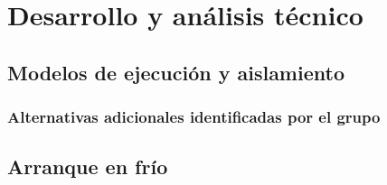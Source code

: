 
\section{Desarrollo y análisis técnico}

\subsection{Modelos de ejecución y aislamiento}


\subsubsection{Alternativas adicionales identificadas por el grupo}


\subsection{Arranque en frío}


